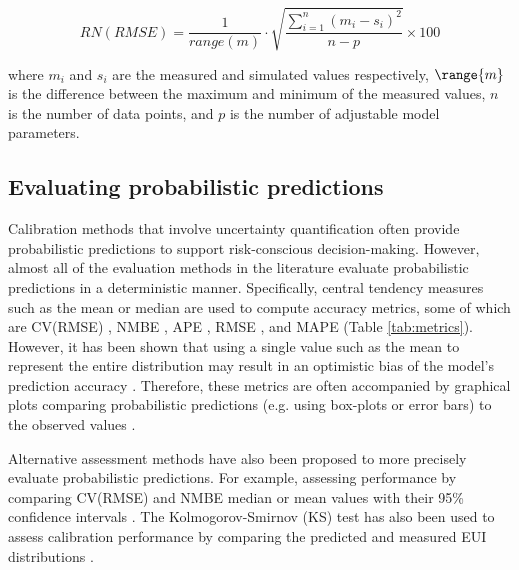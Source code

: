 \documentclass[review]{elsarticle}
\begin{document}
\begin{equation}\label{eq:rnrmse}
RN(RMSE) = \frac{1}{range(m)}\cdot \sqrt{\frac{\sum_{i=1}^n (m_i - s_i)^2}{n-p}} \times 100
\end{equation}

\noindent where $m_i$ and $s_i$ are the measured and simulated values respectively, $\range{m}$ is the difference between the maximum and minimum of the measured values, $n$ is the number of data points, and $p$ is the number of adjustable model parameters.

\subsection{Evaluating probabilistic predictions}

Calibration methods that involve uncertainty quantification often provide probabilistic predictions to support risk-conscious decision-making. However, almost all of the evaluation methods in the literature evaluate probabilistic predictions in a deterministic manner. Specifically, central tendency measures such as the mean or median are used to compute accuracy metrics, some of which are CV(RMSE) \cite{lim2018influences, chong2018guidelines, lim2017comprehensive, chong2017bayesian, yuan2017simultaneous, sokol2017validation, kim2016stepwise, heo2015evaluation, wang2020bayesian, kristensen2020long}, NMBE \cite{chong2018guidelines, chong2017bayesian, kim2016stepwise, kristensen2020long}, APE \cite{cerezo2017comparison, yuan2017simultaneous, sokol2017validation, wang2020bayesian}, RMSE \cite{lim2017comprehensive, heo2015evaluation, tardioli2020methodology}, and MAPE \cite{tardioli2020methodology} (Table \ref{tab:metrics}). However, it has been shown that using a single value such as the mean to represent the entire distribution may result in an optimistic bias of the model's prediction accuracy \cite{chong2019continuous}. Therefore, these metrics are often accompanied by graphical plots comparing probabilistic predictions (e.g. using box-plots or error bars) to the observed values \cite{chong2018guidelines, kristensen2018hierarchical, yuan2017simultaneous, heo2015evaluation, kristensen2020long}. 

Alternative assessment methods have also been proposed to more precisely evaluate probabilistic predictions. For example, assessing performance by comparing CV(RMSE) and NMBE median or mean values with their 95\% confidence intervals \cite{kristensen2018hierarchical, nagpal2019framework, zhu2020uncertainty}. The Kolmogorov-Smirnov (KS) test has also been used to assess calibration performance by comparing the predicted and measured EUI distributions \cite{cerezo2017comparison, sokol2017validation}.
\end{document}
